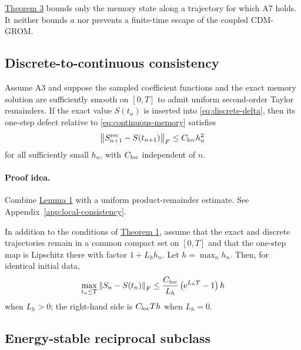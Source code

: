 \begin{remark}
\hyperref[thm:memory-boundedness]{Theorem 3} bounds only the memory state along
a trajectory for which A7 holds. It neither bounds $a$ nor prevents a
finite-time escape of the coupled CDM-GROM.
\end{remark}

\subsection{Discrete-to-continuous consistency}
\label{sec:consistency}

\label{thm:local-consistency}
\begin{theoremone}
Assume A3 and suppose the sampled coefficient functions and the exact memory
solution are sufficiently smooth on $[0,T]$ to admit uniform second-order
Taylor remainders. If the exact value $S(t_n)$ is inserted into
\eqref{eq:discrete-delta}, then its one-step defect relative to
\eqref{eq:continuous-memory} satisfies
\begin{equation}
 \left\lVert S_{n+1}^{\rm rec}-S(t_{n+1})\right\rVert_F
 \le C_{\rm loc}h_n^2
 \label{eq:local-defect}
\end{equation}
for all sufficiently small $h_n$, with $C_{\rm loc}$ independent of $n$.
\end{theoremone}

\paragraph{Proof idea.}
Combine \hyperref[lem:expansions]{Lemma 1} with a uniform product-remainder
estimate. See Appendix~\ref{app:local-consistency}.

\label{cor:global-first-order}
\begin{corollaryone}
In addition to the conditions of \hyperref[thm:local-consistency]{Theorem 1},
assume that the exact and discrete trajectories remain in a common compact
set on $[0,T]$ and that the one-step map is Lipschitz there with factor
$1+L_hh_n$. Let $h=\max_nh_n$. Then, for identical initial data,
\begin{equation}
 \max_{t_n\le T}\left\lVert S_n-S(t_n)\right\rVert_F
 \le
 \frac{C_{\rm loc}}{L_h}
 \left(\mathrm{e}^{L_hT}-1\right)h
 \label{eq:global-first-order}
\end{equation}
when $L_h>0$; the right-hand side is $C_{\rm loc}Th$ when $L_h=0$.
\end{corollaryone}

\subsection{Energy-stable reciprocal subclass}
\label{sec:energy-subclass}

